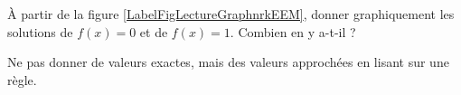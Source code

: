 
\begin{exercice}\label{exoSeconde-0047}

    À partir de la figure \ref{LabelFigLectureGraphnrkEEM}, donner graphiquement les solutions de \( f(x)=0\) et de  \( f(x)=1\). Combien en y a-t-il ?
\newcommand{\CaptionFigLectureGraphnrkEEM}{Dessiner les soutions de \( f(x)=1\).}


Ne pas donner de valeurs exactes, mais des valeurs approchées en lisant sur une règle.

\end{exercice}
